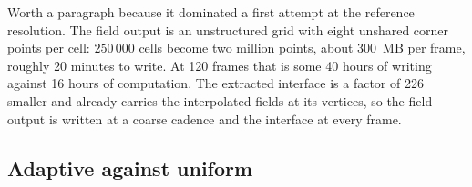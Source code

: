 Worth a paragraph because it dominated a first attempt at the reference
resolution. The field output is an unstructured grid with eight unshared corner
points per cell: $250\,000$ cells become two million points, about 300~MB per
frame, roughly 20 minutes to write. At 120 frames that is some 40 hours of
writing against 16 hours of computation. The extracted interface is a factor of
226 smaller and already carries the interpolated fields at its vertices, so the
field output is written at a coarse cadence and the interface at every frame.

\subsection{Adaptive against uniform}

